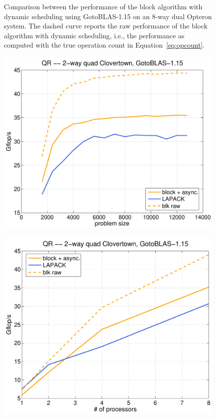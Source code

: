 \documentclass[runningheads]{llncs}
\begin{document}
\begin{figure}
\begin{minipage}[tr]{0.5\textwidth}
\begin{center}
\end{center}
\end{minipage}
\caption{\label{fig:goto_opt}Comparison between the performance of the
block algorithm with dynamic scheduling using GotoBLAS-1.15 on an
8-way dual Opteron system. The dashed curve reports the
raw performance of the block algorithm with dynamic scheduling, i.e.,
the performance as computed with the true operation count in Equation~\eqref{eq:opcount}.}
\end{figure}

\begin{figure}
\begin{minipage}[tl]{0.5\textwidth}
\begin{center}
{\includegraphics[width=1\textwidth]{images/goto_clov_8.pdf}}
\end{center}
\end{minipage}
\hspace{0.25cm}
\begin{minipage}[tr]{0.5\textwidth}
\begin{center}
{\includegraphics[width=1\textwidth]{images/goto_clov_scal.pdf}}

\end{center}
\end{minipage}
\end{figure}
\end{document}
